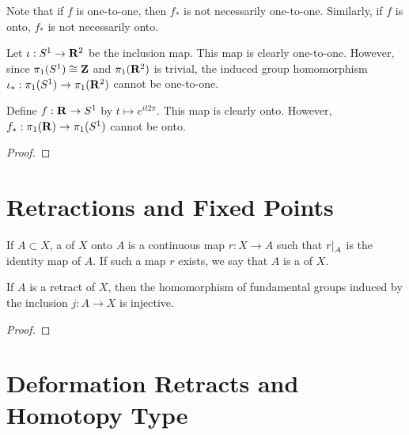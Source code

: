 \begin{remark}
    Note that if $f$ is one-to-one, then $f_\ast$ is not necessarily one-to-one. Similarly, if $f$ is onto, $f_\ast$ is not necessarily onto.
\end{remark}

\begin{example}
    Let $\iota:S^1 \rightarrow \mathbf{R}^2$ be the inclusion map. This map is clearly one-to-one. However, since $\pi_1(S^1) \cong \mathbf{Z}$ and $\pi_1(\mathbf{R}^2)$ is trivial, the induced group homomorphism $\iota_\ast:\pi_1(S^1) \rightarrow \pi_1(\mathbf{R}^2)$ cannot be one-to-one.
\end{example}

\begin{example}
    Define $f:\mathbf{R} \rightarrow S^1$ by $t \mapsto e^{it2\pi}$. This map is clearly onto. However, $f_\ast : \pi_1(\mathbf{R}) \rightarrow \pi_1(S^1)$ cannot be onto.
\end{example}

\begin{proposition}

\end{proposition}
    {\color{red} \begin{proof}
        
    \end{proof}}

\section{Retractions and Fixed Points}

\begin{definition}
    If $A \subset X$, a  of $X$ onto $A$ is a continuous map $r:X \rightarrow A$ such that $\restr{r}{A}$ is the identity map of $A$. If such a map $r$ exists, we say that $A$ is a  of $X$.
\end{definition}

\begin{lemma}\label{lemma:retract-injective}
    If $A$ is a retract of $X$, then the homomorphism of fundamental groups induced by the inclusion $j:A \rightarrow X$ is injective.
\end{lemma}
    {\color{red} \begin{proof}
        
    \end{proof}}

\section{Deformation Retracts and Homotopy Type}

